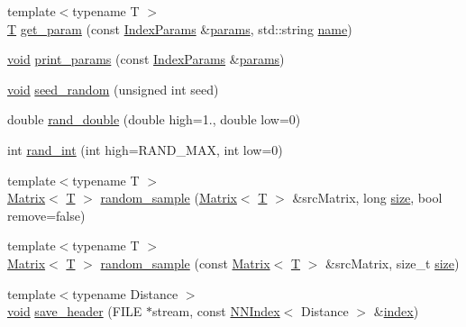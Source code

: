 \begin{DoxyCompactItemize}
\item 
{\footnotesize template$<$typename T $>$ }\\\hyperlink{calib3d_8hpp_a3efb9551a871ddd0463079a808916717}{T} \hyperlink{namespacecvflann_a3f90a8c18db18598d3b96384e89756c1}{get\-\_\-param} (const \hyperlink{namespacecvflann_a742b4c7076c21012054af74a9ee48289}{Index\-Params} \&\hyperlink{compat_8hpp_a0480a03ecc41b20cde376602531d9270}{params}, std\-::string \hyperlink{core__c_8h_add928d8eb85ea33a25a67db3406d4887}{name})
\item 
\hyperlink{legacy_8hpp_a8bb47f092d473522721002c86c13b94e}{void} \hyperlink{namespacecvflann_a09bc605d191fd834d7f1051e28995175}{print\-\_\-params} (const \hyperlink{namespacecvflann_a742b4c7076c21012054af74a9ee48289}{Index\-Params} \&\hyperlink{compat_8hpp_a0480a03ecc41b20cde376602531d9270}{params})
\item 
\hyperlink{legacy_8hpp_a8bb47f092d473522721002c86c13b94e}{void} \hyperlink{namespacecvflann_ad3c02221b783fc335cfd684854c0a870}{seed\-\_\-random} (unsigned int seed)
\item 
double \hyperlink{namespacecvflann_aa67f0a9c42ad900e10dfd3cf0f1e4355}{rand\-\_\-double} (double high=1., double low=0)
\item 
int \hyperlink{namespacecvflann_a95bce8b3d90ee54a8a4454bdc74ead3b}{rand\-\_\-int} (int high=R\-A\-N\-D\-\_\-\-M\-A\-X, int low=0)
\item 
{\footnotesize template$<$typename T $>$ }\\\hyperlink{classcvflann_1_1Matrix}{Matrix}$<$ \hyperlink{calib3d_8hpp_a3efb9551a871ddd0463079a808916717}{T} $>$ \hyperlink{namespacecvflann_a7d1a363a0ec9f5275e4584b61ec52a63}{random\-\_\-sample} (\hyperlink{classcvflann_1_1Matrix}{Matrix}$<$ \hyperlink{calib3d_8hpp_a3efb9551a871ddd0463079a808916717}{T} $>$ \&src\-Matrix, long \hyperlink{legacy_8hpp_ae97003f8d5c64cdfb99f6f2606d121b6}{size}, bool remove=false)
\item 
{\footnotesize template$<$typename T $>$ }\\\hyperlink{classcvflann_1_1Matrix}{Matrix}$<$ \hyperlink{calib3d_8hpp_a3efb9551a871ddd0463079a808916717}{T} $>$ \hyperlink{namespacecvflann_aa6e21823672889593bcd901adc250eba}{random\-\_\-sample} (const \hyperlink{classcvflann_1_1Matrix}{Matrix}$<$ \hyperlink{calib3d_8hpp_a3efb9551a871ddd0463079a808916717}{T} $>$ \&src\-Matrix, size\-\_\-t \hyperlink{legacy_8hpp_ae97003f8d5c64cdfb99f6f2606d121b6}{size})
\item 
{\footnotesize template$<$typename Distance $>$ }\\\hyperlink{legacy_8hpp_a8bb47f092d473522721002c86c13b94e}{void} \hyperlink{namespacecvflann_a7982bbe71fa4c72c311baf11f84a3816}{save\-\_\-header} (F\-I\-L\-E $\ast$stream, const \hyperlink{classcvflann_1_1NNIndex}{N\-N\-Index}$<$ Distance $>$ \&\hyperlink{core__c_8h_a750b5d744c39a06bfb13e6eb010e35d0}{index})

\end{DoxyCompactItemize}
